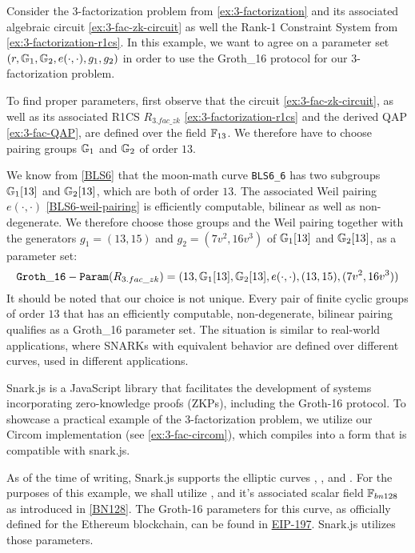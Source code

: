 \begin{example}
\label{ex:3-fac-groth-16-params} Consider the $3$-factorization problem from \ref{ex:3-factorization} and its associated algebraic circuit \ref{ex:3-fac-zk-circuit} as well the Rank-1 Constraint System from \ref{ex:3-factorization-r1cs}. In this example, we want to agree on a parameter set $(r, \mathbb{G}_1, \mathbb{G}_2, e(\cdot,\cdot), g_1, g_2)$ in order to use the Groth\_16 protocol for our $3$-factorization problem. 

To find proper parameters, first observe that the circuit \ref{ex:3-fac-zk-circuit}, as well as its associated R1CS $R_{3.fac\_zk}$ \ref{ex:3-factorization-r1cs} and the derived QAP \ref{ex:3-fac-QAP}, are defined over the field $\mathbb{F}_{13}$. We therefore have to choose pairing groups $\mathbb{G}_1$ and $\mathbb{G}_2$ of order $13$. 

We know from \ref{BLS6} that the moon-math curve \texttt{BLS6\_6} has two subgroups $\mathbb{G}_1[13]$ and $\mathbb{G}_2[13]$, which are both of order $13$. The associated Weil pairing $e(\cdot,\cdot)$ \ref{BLS6-weil-pairing} is efficiently computable, bilinear as well as non-degenerate. We therefore choose those groups and the Weil pairing together with the generators $g_1 = (13,15) $ and $g_2=(7v^2,16v^3)$ of $\mathbb{G}_1[13]$ and $\mathbb{G}_2[13]$, as a parameter set:
$$
\mathtt{Groth\_16-Param}(R_{3.fac\_zk})=(13, \mathbb{G}_1[13], \mathbb{G}_2[13], e(\cdot,\cdot), (13,15),(7v^2,16v^3))
$$
It should be noted that our choice is not unique. Every pair of finite cyclic groups of order $13$ that has an efficiently computable, non-degenerate, bilinear pairing qualifies as a Groth\_16 parameter set. The situation is similar to real-world applications, where SNARKs with equivalent behavior are defined over different curves, used in different applications.
\end{example}
\begin{example}
\label{ex:3-fac-groth-16-params-circom} Snark.js is a JavaScript library that facilitates the development of systems incorporating zero-knowledge proofs (ZKPs), including the Groth-16 protocol. To showcase a practical example of the 3-factorization problem, we utilize our Circom implementation (see \ref{ex:3-fac-circom}), which compiles into a form that is compatible with snark.js.

As of the time of writing, Snark.js supports the elliptic curves , , and . For the purposes of this example, we shall utilize , and it's associated scalar field $\mathbb{F}_{bn128}$ as introduced in \ref{BN128}. The Groth-16 parameters for this curve, as officially defined for the Ethereum blockchain, can be found in \href{https://github.com/ethereum/EIPs/blob/master/EIPS/eip-197.md}{EIP-197}. Snark.js utilizes those parameters.
\end{example}
